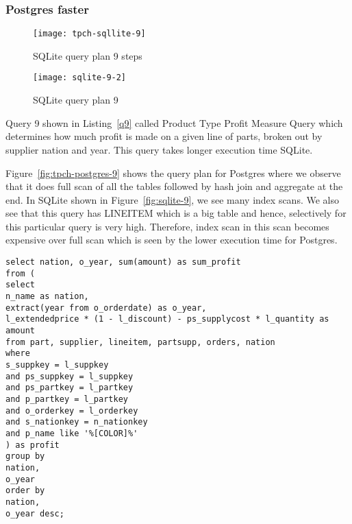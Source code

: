 


\subsubsection{Postgres faster}

\begin{figure*}[ht]
\centering
     \begin{subfigure}[b]{0.4\textwidth}
         \centering
         \texttt{[image: tpch-sqllite-9]}
         \caption{SQLite query plan 9 steps}
         \label{fig:tpch-sqllite-9}
     \end{subfigure}
     \hfill
     \begin{subfigure}[b]{0.4\textwidth}
         \centering
         \texttt{[image: sqlite-9-2]}
         \caption{SQLite query plan 9}
         \label{fig:sqlite-9-2}
     \end{subfigure}

        \caption{SQLite plan for query 9}
        \label{fig:sqlite-9}
\end{figure*}
Query 9 shown in Listing~\ref{q9} called Product Type Profit Measure Query which determines how much profit is made on a given line of parts, broken out by supplier nation and year. This query takes longer execution time SQLite.

Figure~\ref{fig:tpch-postgres-9} shows the query plan for Postgres where we observe that it does full scan of all the tables followed by hash join and aggregate at the end. In SQLite shown in Figure~\ref{fig:sqlite-9}, we see many index scans. We also see that this query has LINEITEM which is a big table and hence, selectively for this particular query is very high. Therefore, index scan in this scan becomes expensive over full scan which is seen by the lower execution time for Postgres.

\begin{minipage}{\linewidth}
\begin{lstlisting}[breaklines=true, numbers=none, label=q9, caption=Query 9]
select nation, o_year, sum(amount) as sum_profit
from (
select
n_name as nation,
extract(year from o_orderdate) as o_year,
l_extendedprice * (1 - l_discount) - ps_supplycost * l_quantity as amount
from part, supplier, lineitem, partsupp, orders, nation
where
s_suppkey = l_suppkey
and ps_suppkey = l_suppkey
and ps_partkey = l_partkey
and p_partkey = l_partkey
and o_orderkey = l_orderkey
and s_nationkey = n_nationkey
and p_name like '%[COLOR]%'
) as profit
group by
nation,
o_year
order by
nation,
o_year desc;
\end{lstlisting}
\end{minipage}

